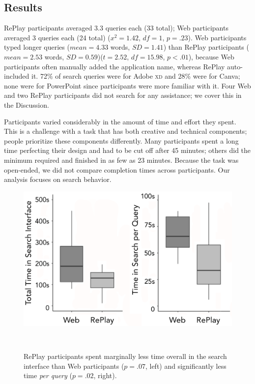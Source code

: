 \subsection{Results}
RePlay participants averaged 3.3 queries each (33 total); Web participants averaged 3 queries each (24 total) ($x^2\!=\!1.42$, $df\!=\!1$, $p\!=\!.23$). Web participants typed longer queries ($mean\!=\!4.33$ words, $SD\!=\!1.41$) than RePlay participants ($mean\!=\!2.53$ words, $SD\!=\!0.59$)($t\!=\!2.52$, $df\!=\!15.98$, $p\!<\!.01$), because Web participants often manually added the application name, whereas RePlay auto-included it. 72\% of search queries were for Adobe \textsc{xd} and 28\% were for Canva; none were for PowerPoint since participants were more familiar with it. Four Web and two RePlay participants did not search for any assistance; we cover this in the Discussion.

Participants varied considerably in the amount of time and effort they spent. This is a challenge with a task that has both creative and technical components; people prioritize these components differently. Many participants spent a long time perfecting their design and had to be cut off after 45 minutes; others did the minimum required and finished in as few as 23 minutes. Because the task was open-ended, we did not compare completion times across participants. Our analysis focuses on search behavior. 

\begin{figure}[b!]
\centering
  \includegraphics[width=.8\textwidth]{replay/figures/study2_graphs.png}
  \caption{RePlay participants spent marginally less time overall in the search interface than Web participants ($p\!=\!.07$, left) and significantly less time \textit{per query} ($p\!=\!.02$, right).}~\label{fig:replay-study2-graphs}
\end{figure}

